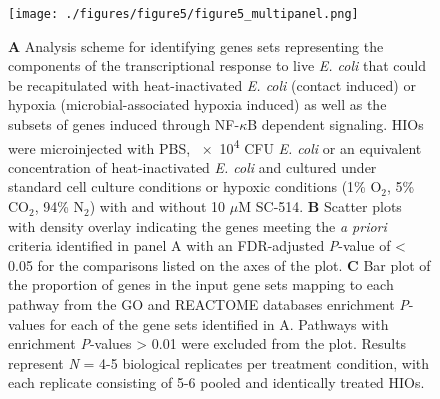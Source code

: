 \documentclass[9pt,lineo]{elife}
\begin{document}
\begin{figure}
\begin{fullwidth}
\centering
\texttt{[image: ./figures/figure5/figure5\_multipanel.png]}
\caption{\textbf{A} Analysis scheme for identifying genes sets representing the components of the transcriptional response to live \textit{E. coli} that could be recapitulated with heat-inactivated \textit{E. coli} (contact induced) or hypoxia (microbial-associated hypoxia induced) as well as the subsets of genes induced through NF-$\kappa$B dependent signaling. HIOs were microinjected with PBS, \num{e4} CFU \textit{E. coli} or an equivalent concentration of heat-inactivated \textit{E. coli} and cultured under standard cell culture conditions or hypoxic conditions (1\% O$_{2}$, 5\% CO$_{2}$, 94\% N$_{2}$) with and without 10 $\mu$M SC-514. \textbf{B} Scatter plots with density overlay indicating the genes meeting the \textit{a priori} criteria identified in panel A with an FDR-adjusted \textit{P}-value of < 0.05 for the comparisons listed on the axes of the plot. \textbf{C} Bar plot of the proportion of genes in the input gene sets mapping to each pathway from the GO and REACTOME databases enrichment \textit{P}-values for each of the gene sets identified in A. Pathways with enrichment \textit{P}-values > 0.01 were excluded from the plot. Results represent \textit{N} = 4-5 biological replicates per treatment condition, with each replicate consisting of 5-6 pooled and identically treated HIOs. }
\label{fig:fullwidth}
\end{fullwidth}
\end{figure}
\end{document}
